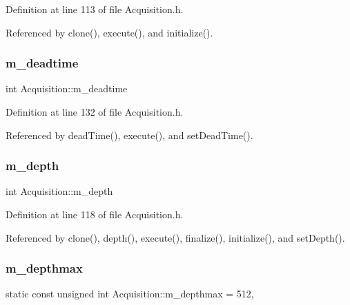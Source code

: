 Definition at line 113 of file Acquisition.\+h.



Referenced by clone(), execute(), and initialize().

\mbox{\label{classAcquisition_a5f7fe20506e7d860ed61935255adfe17}} 
\subsubsection{\texorpdfstring{m\+\_\+deadtime}{m\_deadtime}}
{\footnotesize\ttfamily int Acquisition\+::m\+\_\+deadtime\hspace{0.3cm}{\ttfamily [private]}}



Definition at line 132 of file Acquisition.\+h.



Referenced by dead\+Time(), execute(), and set\+Dead\+Time().

\mbox{\label{classAcquisition_a26628424533a2dd74d24712a14637a72}} 
\subsubsection{\texorpdfstring{m\+\_\+depth}{m\_depth}}
{\footnotesize\ttfamily int Acquisition\+::m\+\_\+depth\hspace{0.3cm}{\ttfamily [private]}}



Definition at line 118 of file Acquisition.\+h.



Referenced by clone(), depth(), execute(), finalize(), initialize(), and set\+Depth().

\mbox{\label{classAcquisition_a82cdfc89b37f20530bf112e13a5c5e5c}} 
\subsubsection{\texorpdfstring{m\+\_\+depthmax}{m\_depthmax}}
{\footnotesize\ttfamily static const unsigned int Acquisition\+::m\+\_\+depthmax = 512\hspace{0.3cm}{\ttfamily [static]}, {\ttfamily [private]}}



